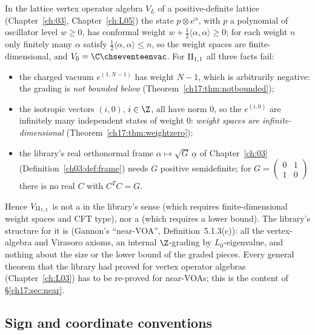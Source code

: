 In the lattice vertex operator algebra $V_L$ of a positive-definite lattice (Chapter~\ref{ch:03},
Chapter~\ref{ch:L05}) the state $p\otimes e^\alpha$, with $p$ a polynomial of oscillator level $w\ge0$,
has conformal weight $w+\tfrac12\langle\alpha,\alpha\rangle\ge0$; for each weight $n$ only finitely many
$\alpha$ satisfy $\tfrac12\langle\alpha,\alpha\rangle\le n$, so the weight spaces are finite-dimensional, and
$V_0=\C\chseventeenvac$.  For ${\mathrm{II}_{1,1}}$ all three facts fail:
\begin{itemize}
\item the charged vacuum $e^{(1,N-1)}$ has weight $N-1$, which is arbitrarily negative: the grading is
  \emph{not bounded below} (Theorem~\ref{ch17:thm:notbounded});
\item the isotropic vectors $(i,0)$, $i\in\Z$, all have norm $0$, so the $e^{(i,0)}$ are infinitely many
  independent states of weight $0$: \emph{weight spaces are infinite-dimensional}
  (Theorem~\ref{ch17:thm:weightzero});
\item the library's real orthonormal frame $\alpha\mapsto\sqrt G\,\underline\alpha$ of Chapter~\ref{ch:03}
  (Definition~\ref{ch03:def:frame}) needs $G$ positive semidefinite; for $G=\left(\begin{smallmatrix}0&1\\1&0\end{smallmatrix}\right)$
  there is no real $C$ with $C^TC=G$.
\end{itemize}
Hence ${V_{\mathrm{II}_{1,1}}}$ is not a  in the library's sense (which requires
finite-dimensional weight spaces and CFT type), nor a  (which requires a
lower bound).  The library's structure for it is  (Gannon's ``near-VOA'', Definition~5.1.3(c)):
all the vertex-algebra and Virasoro axioms, an internal $\Z$-grading by $L_0$-eigenvalue, and nothing about
the size or the lower bound of the graded pieces.  Every general theorem that the library had proved for
vertex operator algebras (Chapter~\ref{ch:L03}) has to be re-proved for near-VOAs; this is the content of
\S\ref{ch17:sec:near}.

\subsection{Sign and coordinate conventions}\label{ch17:sec:conventions}

